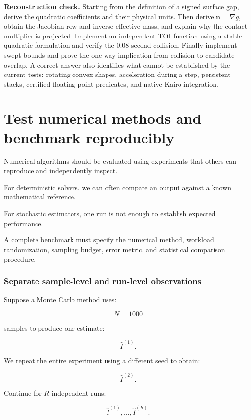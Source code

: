 \textbf{Reconstruction check.} Starting from the definition of a signed surface gap, derive the quadratic coefficients and their physical units. Then derive \(\mathbf n=\nabla g\), obtain the Jacobian row and inverse effective mass, and explain why the contact multiplier is projected. Implement an independent TOI function using a stable quadratic formulation and verify the 0.08-second collision. Finally implement swept bounds and prove the one-way implication from collision to candidate overlap. A correct answer also identifies what cannot be established by the current tests: rotating convex shapes, acceleration during a step, persistent stacks, certified floating-point predicates, and native Kairo integration.

\section{Test numerical methods and benchmark reproducibly}\label{02-foundations-ii-ch031-test-numerical-methods-and-benchmark-reproducibly}

Numerical algorithms should be evaluated using experiments that others can reproduce and independently inspect.

For deterministic solvers, we can often compare an output against a known mathematical reference.

For stochastic estimators, one run is not enough to establish expected performance.

A complete benchmark must specify the numerical method, workload, randomization, sampling budget, error metric, and statistical comparison procedure.

\subsubsection{Separate sample-level and run-level observations}\label{02-foundations-ii-ch031-separate-sample-level-and-run-level-observations}

Suppose a Monte Carlo method uses:

\[ N=1000 \]

samples to produce one estimate:

\[ \widehat I^{(1)}. \]

We repeat the entire experiment using a different seed to obtain:

\[ \widehat I^{(2)}. \]

Continue for \(R\) independent runs:

\[ \widehat I^{(1)},\ldots,\widehat I^{(R)}. \]

